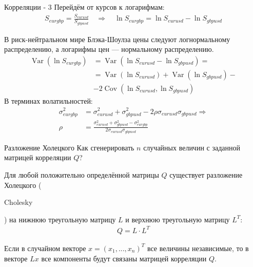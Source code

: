 \documentclass{beamer}
\newcommand{\en}[1]{\begin{otherlanguage}{english}#1\end{otherlanguage}}
\begin{document}
\newcommand{\Var}{\operatorname{Var}}
\newcommand{\Cov}{\operatorname{Cov}}

\begin{frame}{Корреляции - 3}
\justify
Перейдём от курсов к логарифмам:
\begin{align*}
S_{eurgbp} = \frac{S_{eurusd}}{S_{gbpusd}} \quad \Rightarrow \quad \ln S_{eurgbp} = \ln S_{eurusd} - \ln S_{gbpusd} 
\end{align*}

\justify
В риск-нейтральном мире Блэка-Шоулза цены следуют логнормальному распределению, а логарифмы цен --- нормальному распределению.
\begin{align*}
\Var(\ln S_{eurgbp}) &= \Var(\ln S_{eurusd} - \ln S_{gbpusd}) = \\
&= \Var(\ln S_{eurusd}) + \Var(\ln S_{gbpusd}) - \\
&- 2\Cov(\ln S_{eurusd}, \ln S_{gbpusd})
\end{align*}
В терминах волатильностей:
\begin{align*}
\sigma_{eurgbp}^2 &= \sigma_{eurusd}^2 + \sigma_{gbpusd}^2 - 2\rho\sigma_{eurusd}\sigma_{gbpusd} \Rightarrow \\
\rho &= \frac{\sigma_{eurusd}^2 + \sigma_{gbpusd}^2 - \sigma_{eurgbp}^2}{2\sigma_{eurusd}\sigma_{gbpusd}}
\end{align*}
\end{frame}



\begin{frame}{Разложение Холецкого}
\justify
Как сгенерировать $n$ случайных величин с заданной матрицей корреляции $Q$?

\justify
Для любой положительно определённой матрицы $Q$ существует разложение Холецкого (\en{Cholesky}) на нижнюю треугольную матрицу $L$ и верхнюю треугольную матрицу $L^T$:
\begin{align*}
Q = L \cdot L^T
\end{align*}

\justify
Если в случайном векторе $x=(x_1,...,x_n)^T$ все величины независимые, то в векторе $Lx$ все компоненты будут связаны матрицей корреляции $Q$.
\end{frame}
\end{document}
